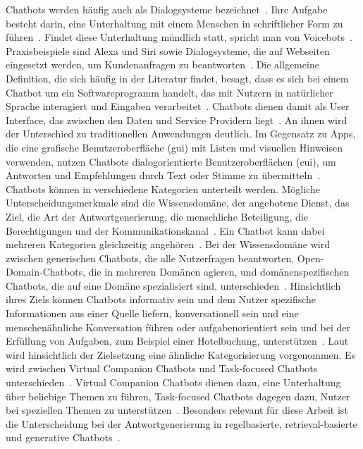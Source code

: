 Chatbots werden häufig auch als Dialogsysteme bezeichnet~\cite[99]{cb05}. Ihre Aufgabe besteht darin, eine Unterhaltung mit einem Menschen in schriftlicher Form 
zu führen~\cite[99]{cb05}. Findet diese Unterhaltung mündlich statt, spricht man von Voicebots~\cite[99]{cb05}. Praxisbeispiele sind Alexa und Siri sowie Dialogsysteme, die auf
Webseiten eingesetzt werden, um Kundenanfragen zu beantworten~\cite[99]{cb05}. Die allgemeine Definition, die sich häufig in der Literatur findet, besagt, dass es sich
bei einem Chatbot um ein Softwareprogramm handelt, das mit Nutzern in natürlicher Sprache interagiert und Eingaben verarbeitet~\cite[237]{cb03}\cite[1]{cb04}. Chatbots 
dienen damit
als User Interface, das zwischen den Daten und Service Providern liegt~\cite[377]{cb02}. An ihnen wird der Unterschied zu traditionellen Anwendungen deutlich. Im 
Gegensatz zu Apps, die eine grafische Benutzeroberfläche (\ac{gui}) mit Listen und visuellen Hinweisen verwenden, nutzen Chatbots dialogorientierte
Benutzeroberflächen (\ac{cui}), um Antworten und Empfehlungen durch Text oder Stimme zu übermitteln~\cite[1\psqq]{cb04}. \\
Chatbots können in verschiedene Kategorien unterteilt werden. Mögliche Unterscheidungsmerkmale sind die Wissensdomäne, der angebotene Dienst, das Ziel, die Art der 
Antwortgenerierung, die menschliche Beteiligung, die Berechtigungen und der Kommunikationskanal~\cite[3]{cb11}. Ein Chatbot kann dabei mehreren Kategorien gleichzeitig 
angehören~\cite[3]{cb11}. Bei der Wissensdomäne wird zwischen generischen Chatbots, die alle Nutzerfragen beantworten, Open-Domain-Chatbots, die in mehreren 
Domänen agieren, und domänenspezifischen Chatbots, die auf eine Domäne spezialisiert sind, unterschieden~\cite[3]{cb11}. Hinsichtlich ihres Ziels können Chatbots 
informativ sein und dem Nutzer spezifische Informationen aus einer Quelle liefern, konversationell sein und eine menschenähnliche Konversation
führen oder aufgabenorientiert sein und bei der Erfüllung von Aufgaben, zum Beispiel einer Hotelbuchung, unterstützen~\cite[3]{cb11}. Laut~\textcite{cb03} wird hinsichtlich 
der Zielsetzung eine ähnliche Kategorisierung vorgenommen. Es wird zwischen Virtual Companion Chatbots und Task-focused Chatbots unterschieden~\cite[243]{cb03}. 
Virtual Companion Chatbots dienen dazu, eine Unterhaltung über beliebige Themen zu führen, Task-focused Chatbots dagegen dazu, Nutzer bei speziellen Themen zu
unterstützen~\cite[243]{cb03}. Besonders relevant für diese Arbeit ist die Unterscheidung bei der Antwortgenerierung in regelbasierte, 
retrieval-basierte und generative Chatbots~\cite[4]{cb11}. \\

